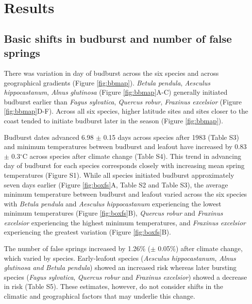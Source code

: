 \documentclass{article}\usepackage[]{graphicx}\usepackage[]{color}
\begin{document}
\renewcommand{\thetable}{\arabic{table}}
\renewcommand{\thefigure}{\arabic{figure}}
\renewcommand{\labelitemi}{$-$}


\section*{Results}
\subsection*{Basic shifts in budburst and number of false springs}
There was variation in day of budburst across the six species and across geographical gradients (Figure \ref{fig:bbmap}). \textit{Betula pendula}, \textit{Aesculus hippocastanum}, \textit{Alnus glutinosa} (Figure \ref{fig:bbmap}A-C) generally initiated budburst earlier than \textit{Fagus sylvatica}, \textit{Quercus robur}, \textit{Fraxinus excelsior} (Figure \ref{fig:bbmap}D-F). Across all six species, higher latitude sites and sites closer to the coast tended to initiate budburst later in the season (Figure \ref{fig:bbmap}).  

Budburst dates advanced 6.98 $\pm$ 0.15 days across species after 1983 (Table S3) and minimum temperatures between budburst and leafout have increased by 0.83 $\pm$ 0.3$^{\circ}$C across species after climate change (Table S4). This trend in advancing day of budburst for each species corresponds closely with increasing mean spring temperatures (Figure S1). While all species initiated budburst approximately seven days earlier (Figure \ref{fig:boxfs}A, Table S2 and Table S3), the average minimum temperature between budburst and leafout varied across the six species with \textit{Betula pendula} and \textit{Aesculus hippocastanum} experiencing the lowest minimum temperatures (Figure \ref{fig:boxfs}B), \textit{Quercus robur} and \textit{Fraxinus excelsior} experiencing the highest minimum temperatures, and \textit{Fraxinus excelsior} experiencing the greatest variation (Figure \ref{fig:boxfs}B). 

The number of false springs increased by 1.26\% ($\pm$ 0.05\%) after climate change, which varied by species. Early-leafout species (\textit{Aesculus hippocastanum, \textit{Alnus glutinosa} and \textit{Betula pendula}}) showed an increased risk whereas later bursting species (\textit{Fagus sylvatica}, \textit{Quercus robur} and \textit{Fraxinus excelsior}) showed a decrease in risk (Table S5). These estimates, however, do not consider shifts in the climatic and geographical factors that may underlie this change.
\end{document}
